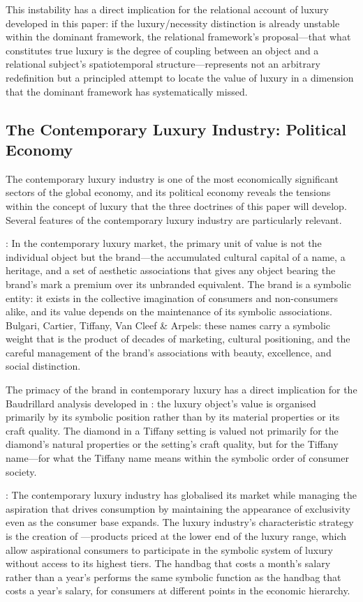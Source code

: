 This instability has a direct implication for the relational account of luxury developed in this paper: if the luxury/necessity distinction is already unstable within the dominant framework, the relational framework's proposal---that what constitutes true luxury is the degree of coupling between an object and a relational subject's spatiotemporal structure---represents not an arbitrary redefinition but a principled attempt to locate the value of luxury in a dimension that the dominant framework has systematically missed.

\subsection{The Contemporary Luxury Industry: Political Economy}
\label{p16:subsec:industry}

\noindent
The contemporary luxury industry is one of the most economically significant sectors of the global economy, and its political economy reveals the tensions within the concept of luxury that the three doctrines of this paper will develop. Several features of the contemporary luxury industry are particularly relevant.

: In the contemporary luxury market, the primary unit of value is not the individual object but the brand---the accumulated cultural capital of a name, a heritage, and a set of aesthetic associations that gives any object bearing the brand's mark a premium over its unbranded equivalent. The brand is a symbolic entity: it exists in the collective imagination of consumers and non-consumers alike, and its value depends on the maintenance of its symbolic associations. Bulgari, Cartier, Tiffany, Van Cleef \& Arpels: these names carry a symbolic weight that is the product of decades of marketing, cultural positioning, and the careful management of the brand's associations with beauty, excellence, and social distinction.

The primacy of the brand in contemporary luxury has a direct implication for the Baudrillard analysis developed in : the luxury object's value is organised primarily by its symbolic position rather than by its material properties or its craft quality. The diamond in a Tiffany setting is valued not primarily for the diamond's natural properties or the setting's craft quality, but for the Tiffany name---for what the Tiffany name means within the symbolic order of consumer society.

: The contemporary luxury industry has globalised its market while managing the aspiration that drives consumption by maintaining the appearance of exclusivity even as the consumer base expands. The luxury industry's characteristic strategy is the creation of ---products priced at the lower end of the luxury range, which allow aspirational consumers to participate in the symbolic system of luxury without access to its highest tiers. The handbag that costs a month's salary rather than a year's performs the same symbolic function as the handbag that costs a year's salary, for consumers at different points in the economic hierarchy.

